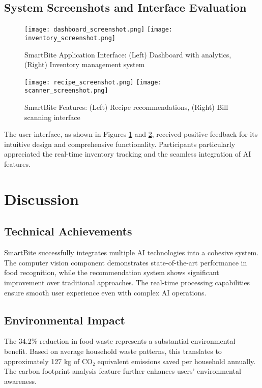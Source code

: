 \documentclass[conference]{IEEEtran}
\begin{document}
\subsection{System Screenshots and Interface Evaluation}

\begin{figure}[htbp]
\centering
\texttt{[image: dashboard\_screenshot.png]}
\texttt{[image: inventory\_screenshot.png]}
\caption{SmartBite Application Interface: (Left) Dashboard with analytics, (Right) Inventory management system}
\label{fig:interface}
\end{figure}

\begin{figure}[htbp]
\centering
\texttt{[image: recipe\_screenshot.png]}
\texttt{[image: scanner\_screenshot.png]}
\caption{SmartBite Features: (Left) Recipe recommendations, (Right) Bill scanning interface}
\label{fig:features}
\end{figure}

The user interface, as shown in Figures \ref{fig:interface} and \ref{fig:features}, received positive feedback for its intuitive design and comprehensive functionality. Participants particularly appreciated the real-time inventory tracking and the seamless integration of AI features.

\section{Discussion}

\subsection{Technical Achievements}
SmartBite successfully integrates multiple AI technologies into a cohesive system. The computer vision component demonstrates state-of-the-art performance in food recognition, while the recommendation system shows significant improvement over traditional approaches. The real-time processing capabilities ensure smooth user experience even with complex AI operations.

\subsection{Environmental Impact}
The 34.2\% reduction in food waste represents a substantial environmental benefit. Based on average household waste patterns, this translates to approximately 127 kg of CO₂ equivalent emissions saved per household annually. The carbon footprint analysis feature further enhances users' environmental awareness.
\end{document}
